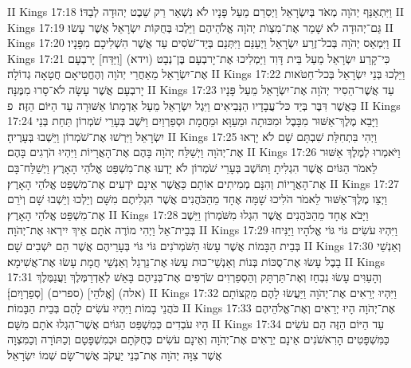II Kings 17:18	וַיִּתְאַנַּף יְהֹוָה מְאֹד בְּיִשְׂרָאֵל וַיְסִרֵם מֵעַל פָּנָיו לֹא נִשְׁאַר רַק שֵׁבֶט יְהוּדָה לְבַדּוֹ׃
II Kings 17:19	גַּם־יְהוּדָה לֹא שָׁמַר אֶת־מִצְוֺת יְהֹוָה אֱלֹהֵיהֶם וַיֵּלְכוּ בְּחֻקּוֹת יִשְׂרָאֵל אֲשֶׁר עָשׂוּ׃
II Kings 17:20	וַיִּמְאַס יְהֹוָה בְּכל־זֶרַע יִשְׂרָאֵל וַיְעַנֵּם וַיִּתְּנֵם בְּיַד־שֹׁסִים עַד אֲשֶׁר הִשְׁלִיכָם מִפָּנָיו׃
II Kings 17:21	כִּי־קָרַע יִשְׂרָאֵל מֵעַל בֵּית דָּוִד וַיַּמְלִיכוּ אֶת־יָרבְעָם בֶּן־נְבָט (וידא) [וַיַּדַּח] יָרבְעָם אֶת־יִשְׂרָאֵל מֵאַחֲרֵי יְהֹוָה וְהֶחֱטִיאָם חֲטָאָה גְדוֹלָה׃
II Kings 17:22	וַיֵּלְכוּ בְּנֵי יִשְׂרָאֵל בְּכל־חַטֹּאות יָרבְעָם אֲשֶׁר עָשָׂה לֹא־סָרוּ מִמֶּנָּה׃
II Kings 17:23	עַד אֲשֶׁר־הֵסִיר יְהֹוָה אֶת־יִשְׂרָאֵל מֵעַל פָּנָיו כַּאֲשֶׁר דִּבֶּר בְּיַד כּל־עֲבָדָיו הַנְּבִיאִים וַיִּגֶל יִשְׂרָאֵל מֵעַל אַדְמָתוֹ אַשּׁוּרָה עַד הַיּוֹם הַזֶּה׃ {פ}
II Kings 17:24	וַיָּבֵא מֶלֶךְ־אַשּׁוּר מִבָּבֶל וּמִכּוּתָה וּמֵעַוָּא וּמֵחֲמָת וּסְפַרְוַיִם וַיֹּשֶׁב בְּעָרֵי שֹׁמְרוֹן תַּחַת בְּנֵי יִשְׂרָאֵל וַיִּרְשׁוּ אֶת־שֹׁמְרוֹן וַיֵּשְׁבוּ בְּעָרֶיהָ׃
II Kings 17:25	וַיְהִי בִּתְחִלַּת שִׁבְתָּם שָׁם לֹא יָרְאוּ אֶת־יְהֹוָה וַיְשַׁלַּח יְהֹוָה בָּהֶם אֶת־הָאֲרָיוֹת וַיִּהְיוּ הֹרְגִים בָּהֶם׃
II Kings 17:26	וַיֹּאמְרוּ לְמֶלֶךְ אַשּׁוּר לֵאמֹר הַגּוֹיִם אֲשֶׁר הִגְלִיתָ וַתּוֹשֶׁב בְּעָרֵי שֹׁמְרוֹן לֹא יָדְעוּ אֶת־מִשְׁפַּט אֱלֹהֵי הָאָרֶץ וַיְשַׁלַּח־בָּם אֶת־הָאֲרָיוֹת וְהִנָּם מְמִיתִים אוֹתָם כַּאֲשֶׁר אֵינָם יֹדְעִים אֶת־מִשְׁפַּט אֱלֹהֵי הָאָרֶץ׃
II Kings 17:27	וַיְצַו מֶלֶךְ־אַשּׁוּר לֵאמֹר הֹלִיכוּ שָׁמָּה אֶחָד מֵהַכֹּהֲנִים אֲשֶׁר הִגְלִיתֶם מִשָּׁם וְיֵלְכוּ וְיֵשְׁבוּ שָׁם וְיֹרֵם אֶת־מִשְׁפַּט אֱלֹהֵי הָאָרֶץ׃
II Kings 17:28	וַיָּבֹא אֶחָד מֵהַכֹּהֲנִים אֲשֶׁר הִגְלוּ מִשֹּׁמְרוֹן וַיֵּשֶׁב בְּבֵית־אֵל וַיְהִי מוֹרֶה אֹתָם אֵיךְ יִירְאוּ אֶת־יְהֹוָה׃
II Kings 17:29	וַיִּהְיוּ עֹשִׂים גּוֹי גּוֹי אֱלֹהָיו וַיַּנִּיחוּ  בְּבֵית הַבָּמוֹת אֲשֶׁר עָשׂוּ הַשֹּׁמְרֹנִים גּוֹי גּוֹי בְּעָרֵיהֶם אֲשֶׁר הֵם יֹשְׁבִים שָׁם׃
II Kings 17:30	וְאַנְשֵׁי בָבֶל עָשׂוּ אֶת־סֻכּוֹת בְּנוֹת וְאַנְשֵׁי־כוּת עָשׂוּ אֶת־נֵרְגַל וְאַנְשֵׁי חֲמָת עָשׂוּ אֶת־אֲשִׁימָא׃
II Kings 17:31	וְהָעַוִּים עָשׂוּ נִבְחַז וְאֶת־תַּרְתָּק וְהַסְפַרְוִים שֹׂרְפִים אֶת־בְּנֵיהֶם בָּאֵשׁ לְאַדְרַמֶּלֶךְ וַעֲנַמֶּלֶךְ (אלה) [אֱלֹהֵי] (ספרים) [סְפַרְוָיִם]׃
II Kings 17:32	וַיִּהְיוּ יְרֵאִים אֶת־יְהֹוָה וַיַּעֲשׂוּ לָהֶם מִקְצוֹתָם כֹּהֲנֵי בָמוֹת וַיִּהְיוּ עֹשִׂים לָהֶם בְּבֵית הַבָּמוֹת׃
II Kings 17:33	אֶת־יְהֹוָה הָיוּ יְרֵאִים וְאֶת־אֱלֹהֵיהֶם הָיוּ עֹבְדִים כְּמִשְׁפַּט הַגּוֹיִם אֲשֶׁר־הִגְלוּ אֹתָם מִשָּׁם׃
II Kings 17:34	עַד הַיּוֹם הַזֶּה הֵם עֹשִׂים כַּמִּשְׁפָּטִים הָרִאשֹׁנִים אֵינָם יְרֵאִים אֶת־יְהֹוָה וְאֵינָם עֹשִׂים כְּחֻקֹּתָם וּכְמִשְׁפָּטָם וְכַתּוֹרָה וְכַמִּצְוָה אֲשֶׁר צִוָּה יְהֹוָה אֶת־בְּנֵי יַעֲקֹב אֲשֶׁר־שָׂם שְׁמוֹ יִשְׂרָאֵל׃
